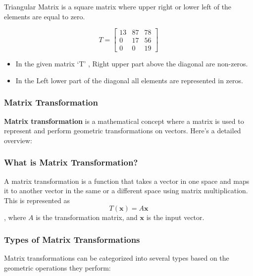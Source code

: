 \documentclass[11pt]{article}
\providecommand{\tightlist}{%
      \setlength{\itemsep}{0pt}\setlength{\parskip}{0pt}}
\begin{document}
Triangular Matrix is a square matrix where upper right or lower left of
the elements are equal to zero.

\[
T = \begin{bmatrix}
13 & 87 & 78 \\
0 & 17 & 56 \\
0 & 0 & 19
\end{bmatrix}
\]

\begin{itemize}
\tightlist
\item
  In the given matrix `T' , Right upper part above the diagonal are
  non-zeros.
\item
  In the Left lower part of the diagonal all elements are represented in
  zeros.
\end{itemize}

    \hypertarget{matrix-transformation}{%
\subsubsection{\texorpdfstring{\textbf{Matrix
Transformation}}{Matrix Transformation}}\label{matrix-transformation}}

    \textbf{Matrix transformation} is a mathematical concept where a matrix
is used to represent and perform geometric transformations on vectors.
Here's a detailed overview:

\hypertarget{what-is-matrix-transformation}{%
\subsubsection{What is Matrix
Transformation?}\label{what-is-matrix-transformation}}

A matrix transformation is a function that takes a vector in one space
and maps it to another vector in the same or a different space using
matrix multiplication. This is represented as
\[ T(\mathbf{x}) = A\mathbf{x} \], where \(A\) is the transformation
matrix, and \(\mathbf{x}\) is the input vector.

\hypertarget{types-of-matrix-transformations}{%
\subsubsection{Types of Matrix
Transformations}\label{types-of-matrix-transformations}}

Matrix transformations can be categorized into several types based on
the geometric operations they perform:
\end{document}
